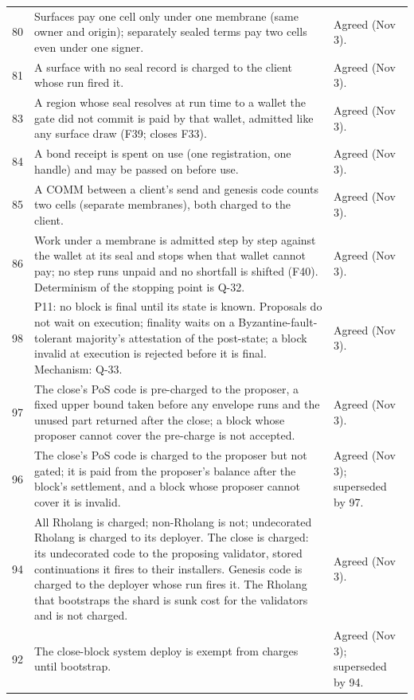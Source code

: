 \documentclass[11pt]{article}
\begin{document}
\begin{longtable}{@{}P{0.8cm}P{9.4cm}P{4.8cm}@{}}
80 & Surfaces pay one cell only under one membrane (same owner and origin); separately sealed terms pay two cells even under one signer. & Agreed (Nov 3). \\
81 & A surface with no seal record is charged to the client whose run fired it. & Agreed (Nov 3). \\
83 & A region whose seal resolves at run time to a wallet the gate did not commit is paid by that wallet, admitted like any surface draw (F39; closes F33). & Agreed (Nov 3). \\
84 & A bond receipt is spent on use (one registration, one handle) and may be passed on before use. & Agreed (Nov 3). \\
85 & A COMM between a client's send and genesis code counts two cells (separate membranes), both charged to the client. & Agreed (Nov 3). \\
86 & Work under a membrane is admitted step by step against the wallet at its seal and stops when that wallet cannot pay; no step runs unpaid and no shortfall is shifted (F40). Determinism of the stopping point is Q-32. & Agreed (Nov 3). \\
98 & P11: no block is final until its state is known. Proposals do not wait on execution; finality waits on a Byzantine-fault-tolerant majority's attestation of the post-state; a block invalid at execution is rejected before it is final. Mechanism: Q-33. & Agreed (Nov 3). \\
97 & The close's PoS code is pre-charged to the proposer, a fixed upper bound taken before any envelope runs and the unused part returned after the close; a block whose proposer cannot cover the pre-charge is not accepted. & Agreed (Nov 3). \\
96 & The close's PoS code is charged to the proposer but not gated; it is paid from the proposer's balance after the block's settlement, and a block whose proposer cannot cover it is invalid. & Agreed (Nov 3); superseded by 97. \\
94 & All Rholang is charged; non-Rholang is not; undecorated Rholang is charged to its deployer. The close is charged: its undecorated code to the proposing validator, stored continuations it fires to their installers. Genesis code is charged to the deployer whose run fires it. The Rholang that bootstraps the shard is sunk cost for the validators and is not charged. & Agreed (Nov 3). \\
92 & The close-block system deploy is exempt from charges until bootstrap. & Agreed (Nov 3); superseded by 94. \\

\end{longtable}
\end{document}
